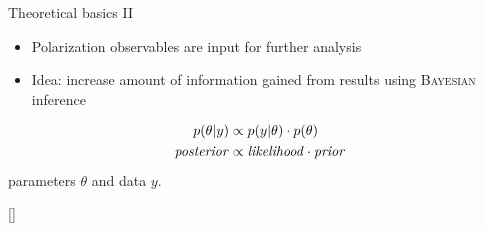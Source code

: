 \documentclass[11pt,aspectratio=169,dvipsnames]{beamer}
\newcommand{\thecolor}{black!70!blue}
\begin{document}
	\begin{frame}{Theoretical basics II}
		\addtocounter{framenumber}{-1}
	\begin{itemize}
		\item Polarization observables are input for further analysis
		\item Idea: increase amount of information gained from results using \textsc{Bayesian} inference 
	\end{itemize}
	\begin{tcolorbox}[colback=blue!5,colframe=\thecolor,title=\textsc{Bayes'} theorem]
		\begin{align*}
			p(\theta|y)&\propto p(y|\theta)\cdot p(\theta)\\
			\text{\emph{posterior}}&\propto\text{\emph{likelihood}}\cdot\text{\emph{prior}}
		\end{align*}
	parameters $\theta$ and data $y$.
	
	
	\begin{flushright}
		{\scriptsize[\cite{bayes}]}
	\end{flushright}
\end{tcolorbox}

	\end{frame}
\end{document}
